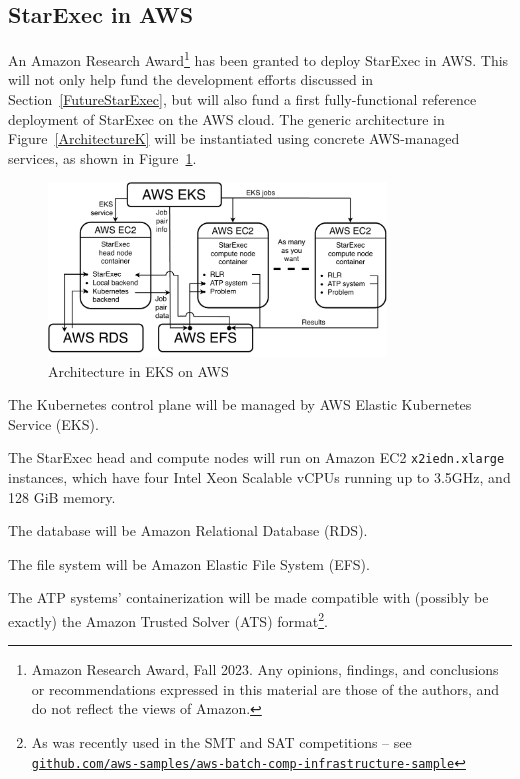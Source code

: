 \documentclass{easychair}
\newenvironment{packed_itemize}{
\vspace*{-0.3em}
\begin{itemize}
\setlength{\partopsep}{0pt}
\setlength{\itemsep}{1pt}
\setlength{\parskip}{0pt}
\setlength{\parsep}{0pt}
}{\end{itemize}}
\newcommand{\dav}[1]{{\color{red}{David: {#1}}}}
\begin{document}
\subsection{StarExec in AWS}

An Amazon Research Award\footnote{%
Amazon Research Award, Fall 2023. Any opinions, findings, and conclusions or recommendations 
expressed in this material are those of the authors, and do not reflect the views of Amazon.} 
has been granted to deploy StarExec in AWS.
This will not only help fund the development efforts discussed in Section~\ref{FutureStarExec}, 
but will also fund a first fully-functional reference deployment of StarExec on the AWS cloud. 
The generic architecture in Figure~\ref{ArchitectureK} will be instantiated using concrete 
AWS-managed services, as shown in Figure~\ref{ArchitectureAWS}.

\begin{figure}[htb]
\begin{center}
\includegraphics[width=0.8\textwidth]{ArchitectureAWS}
\caption{Architecture in EKS on AWS}
\label{ArchitectureAWS}
\end{center}
\end{figure}
\begin{packed_itemize}
	
\item The Kubernetes control plane will be managed by AWS Elastic Kubernetes Service (EKS).
\item The StarExec head and compute nodes will run on Amazon EC2 {\tt x2iedn.xlarge} instances,
      which have four Intel Xeon Scalable vCPUs running up to 3.5GHz, and 128 GiB memory.
\item The database will be Amazon Relational Database (RDS).
\item The file system will be Amazon Elastic File System (EFS).
\item The ATP systems' containerization will be made compatible with (possibly be exactly) the 
      Amazon Trusted Solver (ATS) format\footnote{%
      As was recently used in the SMT and SAT competitions -- see \\
      \href{https://github.com/aws-samples/aws-batch-comp-infrastructure-sample}{\tt github.com/aws-samples/aws-batch-comp-infrastructure-sample}}.
\end{packed_itemize}
\end{document}
